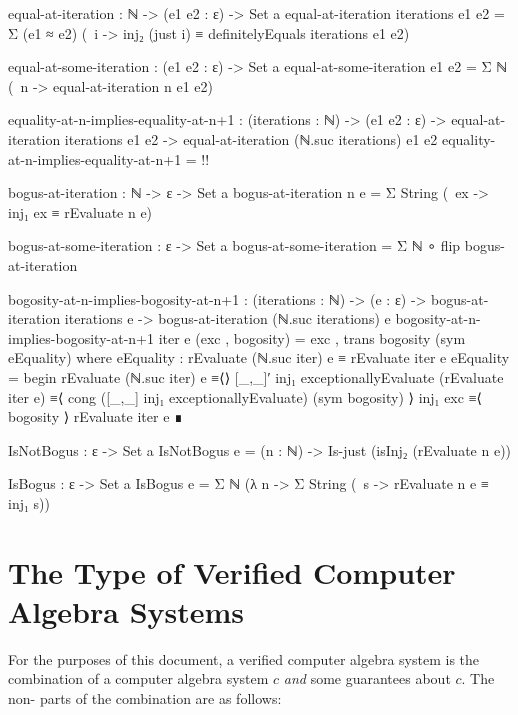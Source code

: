 \documentclass{report}
\begin{document}
\begin{code}
  equal-at-iteration : ℕ -> (e1 e2 : ε) -> Set a
  equal-at-iteration iterations e1 e2 =
    Σ (e1 ≈ e2)
      (\ i -> inj₂ (just i) ≡ definitelyEquals iterations e1 e2)

  equal-at-some-iteration : (e1 e2 : ε) -> Set a
  equal-at-some-iteration e1 e2 = Σ ℕ (\ n -> equal-at-iteration n e1 e2)

  equality-at-n-implies-equality-at-n+1 :
    (iterations : ℕ) ->
    (e1 e2 : ε) ->
    equal-at-iteration iterations e1 e2 ->
    equal-at-iteration (ℕ.suc iterations) e1 e2
  equality-at-n-implies-equality-at-n+1 = {!!}

  bogus-at-iteration : ℕ -> ε -> Set a
  bogus-at-iteration n e = Σ String (\ ex -> inj₁ ex ≡ rEvaluate n e)

  bogus-at-some-iteration : ε -> Set a
  bogus-at-some-iteration = Σ ℕ ∘ flip bogus-at-iteration

  bogosity-at-n-implies-bogosity-at-n+1 :
    (iterations : ℕ) ->
    (e : ε) ->
    bogus-at-iteration iterations e ->
    bogus-at-iteration (ℕ.suc iterations) e
  bogosity-at-n-implies-bogosity-at-n+1 iter e (exc , bogosity) =
    exc , trans bogosity (sym eEquality)
    where
    eEquality : rEvaluate (ℕ.suc iter) e ≡ rEvaluate iter e
    eEquality = begin
      rEvaluate (ℕ.suc iter) e
        ≡⟨⟩
      [_,_]′ inj₁ exceptionallyEvaluate (rEvaluate iter e)
        ≡⟨ cong ([_,_] inj₁ exceptionallyEvaluate) (sym bogosity) ⟩
      inj₁ exc
        ≡⟨ bogosity ⟩
      rEvaluate iter e ∎

  IsNotBogus : ε -> Set a
  IsNotBogus e = (n : ℕ) -> Is-just (isInj₂ (rEvaluate n e))

  IsBogus : ε -> Set a
  IsBogus e = Σ ℕ (λ n -> Σ String (\ s -> rEvaluate n e ≡ inj₁ s))
\end{code}

\section{The Type of Verified Computer Algebra Systems}
For the purposes of this document, a verified computer algebra system is the combination of a  computer algebra system \(c\) \emph{and} some guarantees about \(c\).  The non- parts of the combination are as follows:
\end{document}
